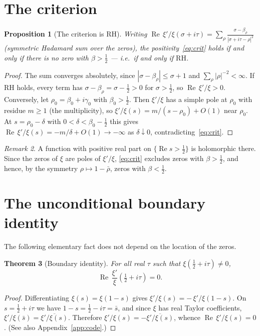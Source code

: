 \documentclass[11pt]{amsart}
\newtheorem{theorem}{Theorem}[section]
\newtheorem{proposition}[theorem]{Proposition}
\theoremstyle{definition}
\theoremstyle{remark}
\newtheorem{remark}[theorem]{Remark}
\newcommand{\RH}{\mathrm{RH}}
\renewcommand{\Re}{\operatorname{Re}}
\newcommand{\half}{\tfrac12}
\begin{document}
\section{The criterion}
\begin{proposition}[The criterion is $\RH$]\label{prop:crit}
Writing $\Re\,\xi'/\xi(\sigma+i\tau)=\sum_\rho\frac{\sigma-\beta_\rho}{|\sigma+i\tau-\rho|^2}$
(symmetric Hadamard sum over the zeros), the positivity~\eqref{eq:crit} holds if
and only if there is no zero with $\beta>\half$ — i.e.\ if and only if $\RH$.
\end{proposition}
\begin{proof}
The sum converges absolutely, since $|\sigma-\beta_\rho|\le\sigma+1$ and
$\sum_\rho|\rho|^{-2}<\infty$. If $\RH$ holds, every term has
$\sigma-\beta_\rho=\sigma-\half>0$ for $\sigma>\half$, so $\Re\,\xi'/\xi>0$.
Conversely, let $\rho_0=\beta_0+i\gamma_0$ with $\beta_0>\half$. Then $\xi'/\xi$ has
a simple pole at $\rho_0$ with residue $m\ge1$ (the multiplicity), so
$\xi'/\xi(s)=m/(s-\rho_0)+O(1)$ near $\rho_0$. At $s=\rho_0-\delta$ with
$0<\delta<\beta_0-\half$ this gives $\Re\,\xi'/\xi(s)=-m/\delta+O(1)\to-\infty$ as
$\delta\downarrow0$, contradicting~\eqref{eq:crit}.
\end{proof}

\begin{remark}
A function with positive real part on $\{\Re s>\half\}$ is holomorphic there. Since
the zeros of $\xi$ are poles of $\xi'/\xi$, \eqref{eq:crit} excludes zeros with
$\beta>\half$, and hence, by the symmetry $\rho\mapsto1-\bar\rho$, zeros with
$\beta<\half$.
\end{remark}

\section{The unconditional boundary identity}
The following elementary fact does not depend on the location of the zeros.
\begin{theorem}[Boundary identity]\label{thm:boundary}
For all real $\tau$ such that $\xi(\half+i\tau)\neq0$,
\[
\Re\,\frac{\xi'}{\xi}\!\left(\half+i\tau\right)=0 .
\]
\end{theorem}
\begin{proof}
Differentiating $\xi(s)=\xi(1-s)$ gives $\xi'/\xi(s)=-\,\xi'/\xi(1-s)$. On
$s=\half+i\tau$ we have $1-s=\half-i\tau=\bar s$, and since $\xi$ has real Taylor
coefficients, $\xi'/\xi(\bar s)=\overline{\xi'/\xi(s)}$. Therefore
$\xi'/\xi(s)=-\overline{\xi'/\xi(s)}$, whence $\Re\,\xi'/\xi(s)=0$. (See also Appendix~\ref{app:code}.)
\end{proof}
\end{document}
